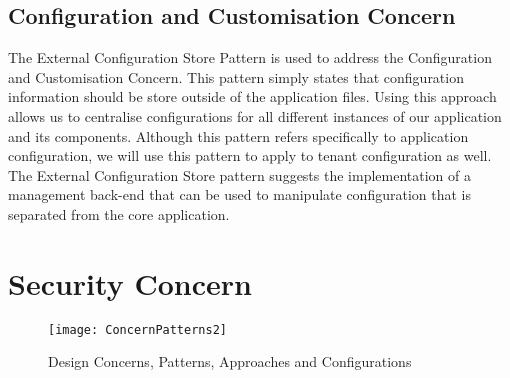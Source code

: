 \subsection{Configuration and Customisation Concern}
The External Configuration Store Pattern is used to address the Configuration and Customisation Concern. This pattern simply states that configuration information should be store outside of the application files. Using this approach allows us to centralise configurations for all different instances of our application and its components. Although this pattern refers specifically to application configuration, we will use this pattern to apply to tenant configuration as well. The External Configuration Store pattern suggests the implementation of a management back-end that can be used to manipulate configuration that is separated from the core application.

\section{Security Concern}


\begin{figure}
\centering
\texttt{[image: ConcernPatterns2]}
\caption{Design Concerns, Patterns, Approaches and Configurations}
\label{fig:concernpatterns}
\end{figure}
